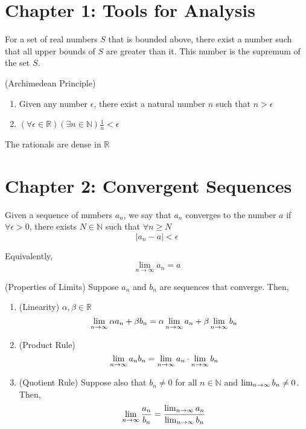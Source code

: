\documentclass{article}
\begin{document}
\section{Chapter 1: Tools for Analysis}
\begin{definition}
    For a set of real numbers $S$ that is bounded above, there exist a number such that all
    upper bounds of $S$ are greater than it. This number is the supremum of the set $S$.
\end{definition}
\begin{theorem}
   (Archimedean Principle) 
   
   \begin{enumerate}
       \item Given any number $\epsilon$, there exist a natural number $n$ such that $n>\epsilon$
       \item $(\forall\epsilon\in \mathbb{R}) (\exists n\in \mathbb{N}) \frac{1}{n} < \epsilon$
   \end{enumerate}
\end{theorem}
\begin{theorem}
    The rationals are dense in $\mathbb{R}$
\end{theorem}

\newpage
\section{Chapter 2: Convergent Sequences}
\begin{definition}
    Given a sequence of numbers ${a_n}$, we say that ${a_n}$ converges to the number $a$
    if $\forall \epsilon>0$, there exists $N\in \mathbb{N}$ such that $\forall n \ge N$
    \[|a_n - a| < \epsilon\]
\end{definition}
Equivalently,
\[ \lim_{n \to \infty} a_n = a \]

\begin{theorem}
    (Properties of Limits) Suppose ${a_n}$ and ${b_n}$ are sequences that converge. Then,
    \begin{enumerate}
        \item (Linearity) $\alpha,\beta \in \mathbb{R}$
        \[ \lim_{n \to \infty} \alpha a_n + \beta b_n = \alpha\lim_{n \to \infty} a_n + \beta\lim_{n \to \infty} b_n\]
        \item (Product Rule)
        \[ \lim_{n \to \infty} a_nb_n = \lim_{n \to \infty} a_n \cdot \lim_{n \to \infty} b_n \]
        \item (Quotient Rule) Suppose also that $b_n \neq 0$ for all $n\in \mathbb{N}$ and
        $\lim_{n \to \infty} b_n \neq 0$. Then,
        \[ \lim_{n \to \infty} \frac{a_n}{b_n} = \frac{\lim_{n \to \infty} a_n}{\lim_{n \to \infty} b_n}\]
    \end{enumerate}
\end{theorem}
\end{document}
